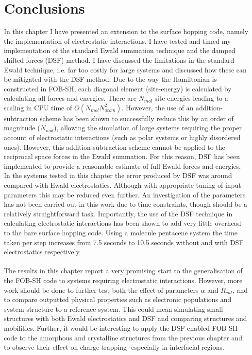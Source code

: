 
\section{Conclusions}
In this chapter I have presented an extension to the surface hopping code, namely the implementation of electrostatic interactions. I have tested and timed my implementation of the standard Ewald summation technique and the damped shifted forces (DSF) method. I have discussed the limitations in the standard Ewald technique, i.e. far too costly for large systems and discussed how these can be mitigated with the DSF method. Due to the way the Hamiltonian is constructed in FOB-SH, each diagonal element (site-energy) is calculated by calculating all forces and energies. There are $N_{mol}$ site-energies leading to a scaling in CPU time of $O(N_{mol} N_{atom}^2)$. However, the use of an addition-subtraction scheme has been shown to successfully reduce this by an order of magnitude ($N_{mol}$), allowing the simulation of large systems requiring the proper account of electrostatic interactions (such as polar systems or highly disordered ones). However, this addition-subtraction scheme cannot be applied to the reciprocal space forces in the Ewald summation. For this reason, DSF has been implemented to provide a reasonable estimate of full Ewald forces and energies. In the systems tested in this chapter the error produced by DSF was around  compared with Ewald electrostatics. Although with appropriate tuning of input parameters this may be reduced even further. An investigation of the parameters has not been carried out in this work due to time constraints, though should be a relatively straightforward task. Importantly, the use of the DSF technique in calculating electrostatic interactions has been shown to add very little overhead to the bare surface hopping code. Using a  molecule pentacene system the time taken per step increases from 7.5 seconds to 10.5 seconds without and with DSF electrostatics respectively.
\\\\
The results in this chapter report a very promising start to the generalisation of the FOB-SH code to systems requiring electrostatic interactions. However, more work should be done to further test both the effect of parameters $\alpha$ and $R_{cut}$, and to compare outputted physical properties such as electronic populations and system structure to a reference system. This could mean simulating small  structures with both Ewald electrostatics and DSF and comparing structures and mobilities. Further, it would be interesting to apply the DSF enabled FOB-SH code to the amorphous and crystalline structures from the previous chapter and to observe their effect on charge trapping -especially in interfacial regions.


